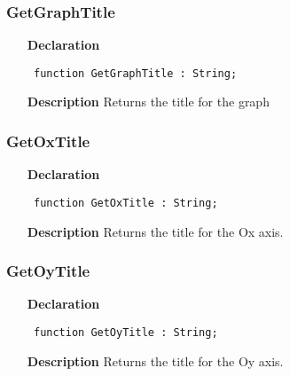 \documentclass[12pt,a4paper,oneside]{report}
\newcommand{\declarationitem}[1]{\textbf{#1}}
\newcommand{\descriptiontitle}[1]{\textbf{#1}}
\newcommand{\code}[1]{\texttt{#1}}
\begin{document}
\subsubsection{GetGraphTitle}
\label{uplot-GetGraphTitle}
\begin{itemize}\item[\declarationitem{Declaration}\hfill]
	\begin{flushleft}
		\code{
			function GetGraphTitle : String;}
		
	\end{flushleft}
	
	\par
	\item[\descriptiontitle{Description}]
	Returns the title for the graph
	
\end{itemize}
\subsubsection{GetOxTitle}
\label{uplot-GetOxTitle}
\begin{itemize}\item[\declarationitem{Declaration}\hfill]
	\begin{flushleft}
		\code{
			function GetOxTitle : String;}
		
	\end{flushleft}
	
	\par
	\item[\descriptiontitle{Description}]
	Returns the title for the Ox axis.
	
\end{itemize}
\subsubsection{GetOyTitle}
\label{uplot-GetOyTitle}
\begin{itemize}\item[\declarationitem{Declaration}\hfill]
	\begin{flushleft}
		\code{
			function GetOyTitle : String;}
		
	\end{flushleft}
	
	\par
	\item[\descriptiontitle{Description}]
	Returns the title for the Oy axis.
	
\end{itemize}
\end{document}
